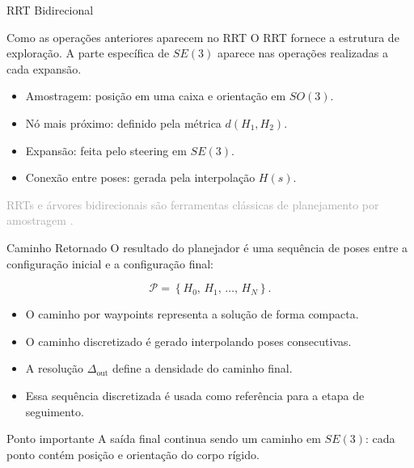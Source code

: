 \documentclass[aspectratio=169]{beamer}
\newcommand{\smalltag}[1]{\textcolor{darkgray}{\scriptsize #1}}
\begin{document}
\begin{frame}{RRT Bidirecional}
    \begin{block}{Como as operações anteriores aparecem no RRT}
        O RRT fornece a estrutura de exploração. A parte específica de \(SE(3)\)
        aparece nas operações realizadas a cada expansão.
    \end{block}

    \vspace{0.2cm}
    \begin{itemize}
        \item Amostragem: posição em uma caixa e orientação em \(SO(3)\).
        \item Nó mais próximo: definido pela métrica \(d(H_1,H_2)\).
        \item Expansão: feita pelo steering em \(SE(3)\).
        \item Conexão entre poses: gerada pela interpolação \(H(s)\).
    \end{itemize}

    \vfill
    \smalltag{RRTs e árvores bidirecionais são ferramentas clássicas de planejamento por amostragem \cite{LaValle2006,Choset2005,KuffnerLaValle2000}.}
\end{frame}

\begin{frame}{Caminho Retornado}
    \small
    O resultado do planejador é uma sequência de poses entre a configuração
    inicial e a configuração final:

    \[
    \mathcal{P}
    =
    \left\{
    H_0,\,
    H_1,\,
    \ldots,\,
    H_N
    \right\}.
    \]

    \begin{itemize}
        \item O caminho por waypoints representa a solução de forma compacta.
        \item O caminho discretizado é gerado interpolando poses consecutivas.
        \item A resolução \(\Delta_{\mathrm{out}}\) define a densidade do caminho final.
        \item Essa sequência discretizada é usada como referência para a etapa de seguimento.
    \end{itemize}

    \vspace{0.2cm}
    \begin{block}{Ponto importante}
        A saída final continua sendo um caminho em \(SE(3)\): cada ponto contém
        posição e orientação do corpo rígido.
    \end{block}
\end{frame}
\end{document}
